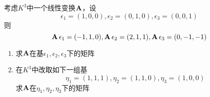 \documentclass[11pt]{article}
\begin{document}
\begin{proposition}[]
考虑\(K^3\)中一个线性变换\(\operatorname{\textbf{A}}\)，设
\begin{equation*}
\epsilon_1=(1,0,0),\epsilon_2=(0,1,0),\epsilon_3=(0,0,1)
\end{equation*}
则
\begin{equation*}
\operatorname{\textbf{A}}\epsilon_1=(-1,1,0),\operatorname{\textbf{A}}\epsilon_2=(2,1,1),\operatorname{\textbf{A}}\epsilon_3=(0,-1,-1)
\end{equation*}
\begin{enumerate}
\item 求\(\operatorname{\textbf{A}}\)在基\(\epsilon_1,\epsilon_2,\epsilon_3\)下的矩阵
\item 在\(K^3\)中改取如下一组基
\begin{equation*}
\eta_1=(1,1,1),\eta_2=(1,1,0),\eta_3=(1,0,0)
\end{equation*}
求\(\operatorname{\textbf{A}}\)在\(\eta_1,\eta_2,\eta_3\)下的矩阵
\end{enumerate}
\end{proposition}
\end{document}
